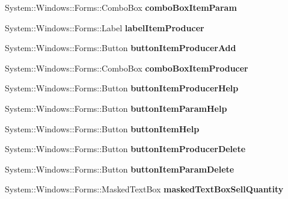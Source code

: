 \begin{DoxyCompactItemize}
\hypertarget{class_magazyn_1_1_magazin_ab0b45324f872d0e3cf29fe2fd5a271f1}{}\label{class_magazyn_1_1_magazin_ab0b45324f872d0e3cf29fe2fd5a271f1} 
System\+::\+Windows\+::\+Forms\+::\+Combo\+Box {\bfseries combo\+Box\+Item\+Param}
\item 
\hypertarget{class_magazyn_1_1_magazin_ab8d8b8bb48fe30de1bea6f39de92042d}{}\label{class_magazyn_1_1_magazin_ab8d8b8bb48fe30de1bea6f39de92042d} 
System\+::\+Windows\+::\+Forms\+::\+Label {\bfseries label\+Item\+Producer}
\item 
\hypertarget{class_magazyn_1_1_magazin_a2a0ab170aec0d5e6e05585633f0b4f79}{}\label{class_magazyn_1_1_magazin_a2a0ab170aec0d5e6e05585633f0b4f79} 
System\+::\+Windows\+::\+Forms\+::\+Button {\bfseries button\+Item\+Producer\+Add}
\item 
\hypertarget{class_magazyn_1_1_magazin_ae9c9d3da85ef496e19e5a0153f959415}{}\label{class_magazyn_1_1_magazin_ae9c9d3da85ef496e19e5a0153f959415} 
System\+::\+Windows\+::\+Forms\+::\+Combo\+Box {\bfseries combo\+Box\+Item\+Producer}
\item 
\hypertarget{class_magazyn_1_1_magazin_a9d1a2c2828396abf525d43a81eda1ce3}{}\label{class_magazyn_1_1_magazin_a9d1a2c2828396abf525d43a81eda1ce3} 
System\+::\+Windows\+::\+Forms\+::\+Button {\bfseries button\+Item\+Producer\+Help}
\item 
\hypertarget{class_magazyn_1_1_magazin_acb29da7dae8fa04eddad56bd7d4e2a2b}{}\label{class_magazyn_1_1_magazin_acb29da7dae8fa04eddad56bd7d4e2a2b} 
System\+::\+Windows\+::\+Forms\+::\+Button {\bfseries button\+Item\+Param\+Help}
\item 
\hypertarget{class_magazyn_1_1_magazin_ad07c6e38b2cb50e95fbe72516720fade}{}\label{class_magazyn_1_1_magazin_ad07c6e38b2cb50e95fbe72516720fade} 
System\+::\+Windows\+::\+Forms\+::\+Button {\bfseries button\+Item\+Help}
\item 
\hypertarget{class_magazyn_1_1_magazin_ac47362f29e95eb9eb536a4e94544cd03}{}\label{class_magazyn_1_1_magazin_ac47362f29e95eb9eb536a4e94544cd03} 
System\+::\+Windows\+::\+Forms\+::\+Button {\bfseries button\+Item\+Producer\+Delete}
\item 
\hypertarget{class_magazyn_1_1_magazin_aaa7233a34a5ef4c7150f6c8095a18448}{}\label{class_magazyn_1_1_magazin_aaa7233a34a5ef4c7150f6c8095a18448} 
System\+::\+Windows\+::\+Forms\+::\+Button {\bfseries button\+Item\+Param\+Delete}
\item 
\hypertarget{class_magazyn_1_1_magazin_a740eaf5fa1492f9720ec8a9baa359c85}{}\label{class_magazyn_1_1_magazin_a740eaf5fa1492f9720ec8a9baa359c85} 
System\+::\+Windows\+::\+Forms\+::\+Masked\+Text\+Box {\bfseries masked\+Text\+Box\+Sell\+Quantity}

\end{DoxyCompactItemize}
